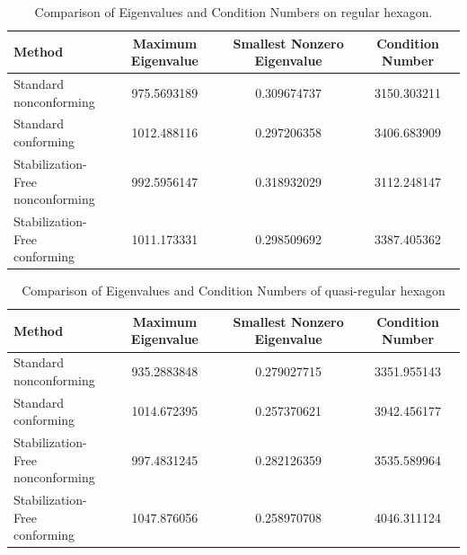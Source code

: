\documentclass[10pt]{amsart}
\theoremstyle{definition}
\theoremstyle{remark}
\begin{document}
\begin{enumerate}[1.]
\begin{table}[h]
\centering
\caption{Comparison of Eigenvalues and Condition Numbers on regular hexagon.}
\label{tab:comparison0}
\begin{tabular}{|l|c|c|c|}
\hline
\textbf{Method} & \textbf{Maximum Eigenvalue} & \textbf{Smallest Nonzero
Eigenvalue} & \textbf{Condition Number} \\ \hline
\thead{Standard \\ nonconforming} & 975.5693189 & 0.309674737 & 3150.303211 \\ \hline
\thead{Standard \\ conforming} & 1012.488116 & 0.297206358 & 3406.683909 \\ \hline
\thead{Stabilization-Free \\ nonconforming} & 992.5956147 & 0.318932029 & 3112.248147 \\ \hline
\thead{Stabilization-Free \\ conforming} & 1011.173331 & 0.298509692 & 3387.405362 \\ \hline
\end{tabular}
\end{table}

\begin{table}[h]
\centering
\caption{Comparison of Eigenvalues and Condition Numbers of quasi-regular hexagon}
\label{tab:comparison1}
\begin{tabular}{|l|c|c|c|}
\hline
\textbf{Method} & \textbf{Maximum Eigenvalue} & \textbf{Smallest Nonzero
Eigenvalue} & \textbf{Condition Number} \\ \hline
\thead{Standard \\ nonconforming} & 935.2883848 & 0.279027715 & 3351.955143 \\ \hline
\thead{Standard \\ conforming} & 1014.672395 & 0.257370621 & 3942.456177 \\ \hline
\thead{Stabilization-Free \\ nonconforming} & 997.4831245 & 0.282126359 & 3535.589964 \\ \hline
\thead{Stabilization-Free \\ conforming} & 1047.876056 & 0.258970708 & 4046.311124 \\ \hline
\end{tabular}
\end{table}


\end{enumerate}
\end{document}
